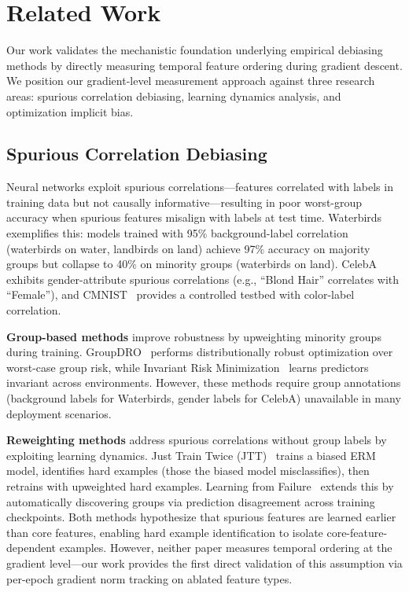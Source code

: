 \section{Related Work}
\label{sec:related}

Our work validates the mechanistic foundation underlying empirical debiasing methods by directly measuring temporal feature ordering during gradient descent. We position our gradient-level measurement approach against three research areas: spurious correlation debiasing, learning dynamics analysis, and optimization implicit bias.

\subsection{Spurious Correlation Debiasing}

Neural networks exploit spurious correlations---features correlated with labels in training data but not causally informative---resulting in poor worst-group accuracy when spurious features misalign with labels at test time. Waterbirds~\cite{sagawa2020distributionally} exemplifies this: models trained with 95\% background-label correlation (waterbirds on water, landbirds on land) achieve 97\% accuracy on majority groups but collapse to 40\% on minority groups (waterbirds on land). CelebA~\cite{liu2015deep} exhibits gender-attribute spurious correlations (e.g., ``Blond Hair'' correlates with ``Female''), and CMNIST~\cite{arjovsky2019invariant} provides a controlled testbed with color-label correlation.

\textbf{Group-based methods} improve robustness by upweighting minority groups during training. GroupDRO~\cite{sagawa2020distributionally} performs distributionally robust optimization over worst-case group risk, while Invariant Risk Minimization~\cite{arjovsky2019invariant} learns predictors invariant across environments. However, these methods require group annotations (background labels for Waterbirds, gender labels for CelebA) unavailable in many deployment scenarios.

\textbf{Reweighting methods} address spurious correlations without group labels by exploiting learning dynamics. Just Train Twice (JTT)~\cite{nam2020learning} trains a biased ERM model, identifies hard examples (those the biased model misclassifies), then retrains with upweighted hard examples. Learning from Failure~\cite{liu2021just} extends this by automatically discovering groups via prediction disagreement across training checkpoints. Both methods hypothesize that spurious features are learned earlier than core features, enabling hard example identification to isolate core-feature-dependent examples. However, neither paper measures temporal ordering at the gradient level---our work provides the first direct validation of this assumption via per-epoch gradient norm tracking on ablated feature types.

